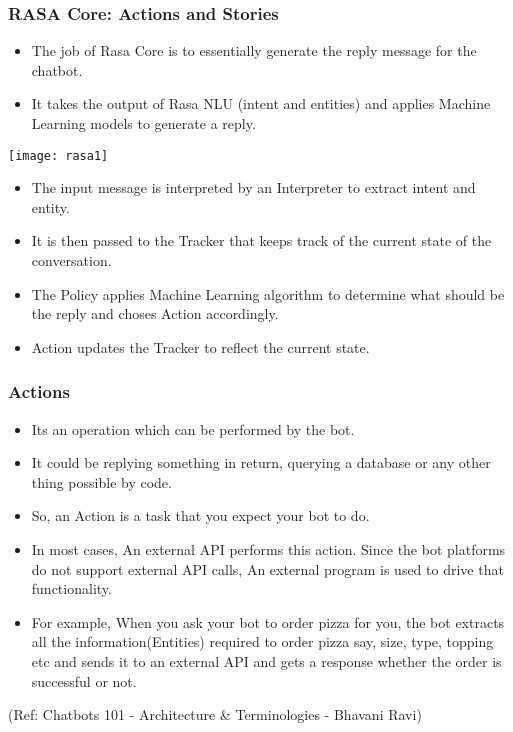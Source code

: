  \begin{frame}[fragile]\frametitle{RASA Core: Actions and Stories}
\begin{itemize}
\item The job of Rasa Core is to essentially generate the reply message for the chatbot. 
\item It takes the output of Rasa NLU (intent and entities) and applies Machine Learning models to generate a reply.
\end{itemize}

\begin{center}
\texttt{[image: rasa1]}
\end{center}

\begin{itemize}
\item The input message is interpreted by an Interpreter to extract intent and entity. 
\item It is then passed to the Tracker that keeps track of the current state of the conversation. 
\item The Policy applies Machine Learning algorithm to determine what should be the reply and choses Action accordingly.
\item Action updates the Tracker to reflect the current state.
\end{itemize}

\end{frame}


 \begin{frame}[fragile]\frametitle{Actions}
\begin{itemize}
\item Its an operation which can be performed by the bot. 
\item It could be replying something in return, querying a database or any other thing possible by code.
\item So, an Action is a task that you expect your bot to do. 
\item In most cases, An external API performs this action. Since the bot platforms do not support external API calls, An external program is used to drive that functionality.
\item For example, When you ask your bot to order pizza for you, the bot extracts all the information(Entities) required to order pizza say, size, type, topping etc and sends it to an external API and gets a response whether the order is successful or not.

\end{itemize}

{\tiny (Ref: Chatbots 101 - Architecture \& Terminologies -  Bhavani Ravi)}

\end{frame}

